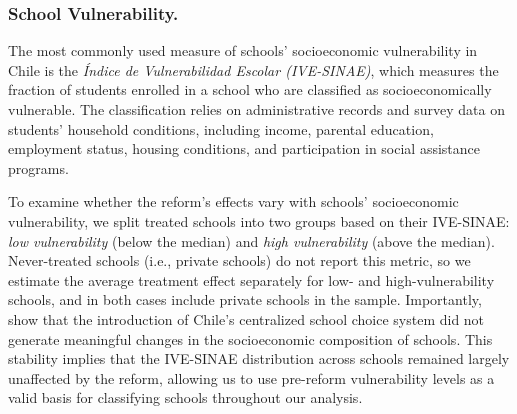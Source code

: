 \subsubsection{School Vulnerability.} The most commonly used measure of schools' socioeconomic vulnerability in Chile is the \emph{Índice de Vulnerabilidad Escolar (IVE-SINAE)}, which measures the fraction of students enrolled in a school who are classified as socioeconomically vulnerable. The classification relies on administrative records and survey data on students' household conditions, including income, parental education, employment status, housing conditions, and participation in social assistance programs. 

To examine whether the reform's effects vary with schools' socioeconomic vulnerability, we split treated schools into two groups based on their IVE-SINAE: \emph{low vulnerability} (below the median) and \emph{high vulnerability} (above the median). Never-treated schools (i.e., private schools) do not report this metric, so we estimate the average treatment effect separately for low- and high-vulnerability schools, and in both cases include private schools in the sample. Importantly, \citet{urzua2023} show that the introduction of Chile's centralized school choice system did not generate meaningful changes in the socioeconomic composition of schools. This stability implies that the IVE-SINAE distribution across schools remained largely unaffected by the reform, allowing us to use pre-reform vulnerability levels as a valid basis for classifying schools throughout our analysis.



\noindent {}

